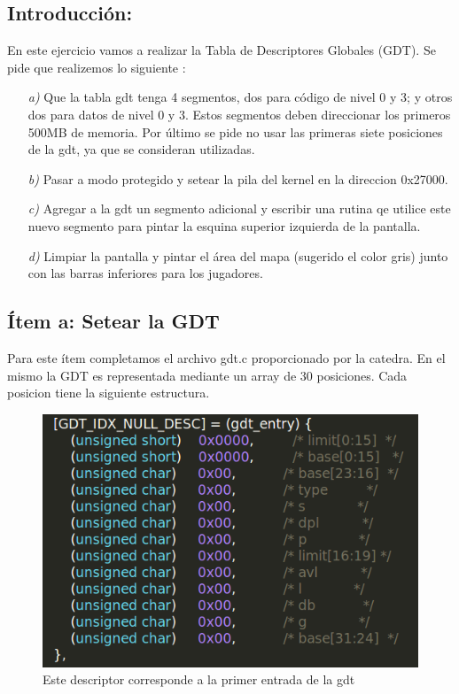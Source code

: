 \subsection{Introducción:}

En este ejercicio vamos a realizar la Tabla de Descriptores Globales (GDT). Se pide que realizemos lo siguiente :

\begin{itemize}
\item [\textit{a)}] Que la tabla gdt tenga 4 segmentos, dos para código de
nivel 0 y 3; y otros dos para datos de nivel 0 y 3. Estos segmentos deben direccionar los primeros 500MB de memoria. Por último se pide no usar las primeras siete posiciones de la gdt, ya que se consideran utilizadas.

\item [\textit{b)}] Pasar a modo protegido y setear la pila del kernel en la direccion 0x27000. 

\item [\textit{c)}] Agregar a la gdt un segmento adicional y escribir una rutina qe utilice este nuevo segmento para pintar la esquina superior izquierda de la pantalla.

\item [\textit{d)}] Limpiar la pantalla y pintar el área del mapa (sugerido el color gris) junto con las barras inferiores para los jugadores.
\end{itemize}

\subsection{Ítem a: Setear la GDT}

Para este ítem completamos el archivo gdt.c proporcionado por la catedra. En el mismo la GDT es representada mediante un array de 30 posiciones. Cada posicion tiene la siguiente estructura.
\\

\begin{figure}[H]
\begin{center}
  \includegraphics[width=\linewidth]{ejercicio1/GDTnula.png}
  \caption{{\small Este descriptor corresponde a la primer entrada de la gdt}} 
\endminipage
\end{center}
\end{figure}

